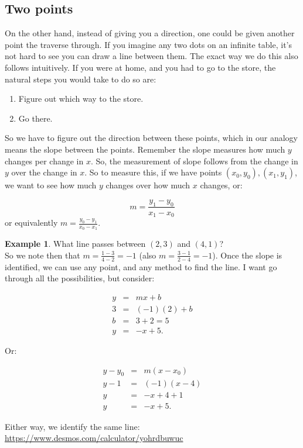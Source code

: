 \documentclass[10pt]{article}
\theoremstyle{definition}
\newtheorem{example}[equation]{Example}
\begin{document}
\subsection{Two points}

On the other hand, instead of giving you a direction, one could be given another point the traverse through.  If you imagine any two dots on an infinite table, it's not hard to see you can draw a line between them.  The exact way we do this also follows intuitively.  If you were at home, and you had to go to the store, the natural steps you would take to do so are:

\begin{enumerate}
\item Figure out which way to the store.
\item Go there.
\end{enumerate}

So we have to figure out the direction between these points, which in our analogy means the slope between the points.  Remember the slope measures how much $y$ changes per change in $x$.  So, the measurement of slope follows from the change in $y$ over the change in $x$.  So to measure this, if we have points $(x_0, y_0), (x_1, y_1)$, we want to see how much $y$ changes over how much $x$ changes, or:

$$m=\frac{y_1-y_0}{x_1-x_0}$$
or equivalently $m=\frac{y_0-y_1}{x_0-x_1}$.


\begin{example}
What line passes between $(2,3)$ and $(4,1)$?\\

So we note then that $m=\frac{1-3}{4-2}=-1$ (also $m=\frac{3-1}{2-4}=-1$).  Once the slope is identified, we can use any point, and any method to find the line.  I want go through all the possibilities, but consider:

\begin{eqnarray*}
y&=&mx+b\\
3&=&(-1)(2)+b\\
b&=&3+2=5\\
y&=&-x+5.
\end{eqnarray*}

Or:

\begin{eqnarray*}
y-y_0&=&m(x-x_0)\\
y-1&=&(-1)(x-4)\\
y&=&-x+4+1\\
y&=&-x+5.
\end{eqnarray*}

Either way, we identify the same line: \url{https://www.desmos.com/calculator/yohrdbuwuc}

\end{example}
\end{document}
